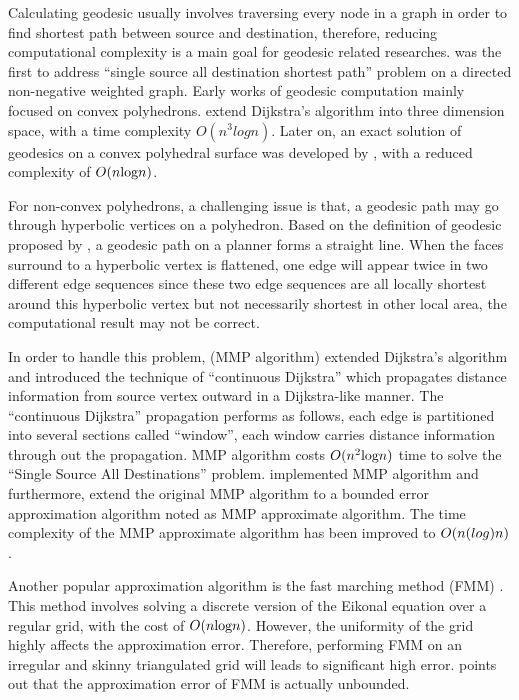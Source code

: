 Calculating geodesic usually involves traversing every node in a graph in order to find shortest path between source and destination, therefore, reducing computational complexity is a main goal for geodesic related researches.  was the first to address ``single source all destination shortest path'' problem on a directed non-negative weighted graph. Early works of geodesic computation mainly focused on convex polyhedrons.  extend Dijkstra's algorithm into three dimension space, with a time complexity $O (n^3 log n)$. Later on, an exact solution of geodesics on a convex polyhedral surface was developed by , with a reduced complexity of $O(n\textup{log}n)$.

For non-convex polyhedrons, a challenging issue is that, a geodesic path may go through hyperbolic vertices on a polyhedron. Based on the definition of geodesic proposed by , a geodesic path on a planner forms a straight line. When the faces surround to a hyperbolic vertex is flattened, one edge will appear twice in two different edge sequences since these two edge sequences are all locally shortest around this hyperbolic vertex but not necessarily shortest in other local area, the computational result may not be correct. 

In order to handle this problem,  (MMP algorithm) extended Dijkstra’s algorithm  and introduced the technique of ``continuous Dijkstra'' which propagates distance information from source vertex outward in a Dijkstra-like manner. The ``continuous Dijkstra'' propagation performs as follows,  each edge is partitioned into several sections called ``window'', each window carries distance information through out the propagation. MMP algorithm costs $O(n^{2}\textup{log}n)$ time to solve the ``Single Source All Destinations'' problem.   implemented MMP algorithm and furthermore, extend the original MMP algorithm  to a bounded error approximation algorithm noted as MMP approximate algorithm. The time complexity of the MMP approximate algorithm has been improved to $O(n\textup(log)n)$ . 

Another popular approximation algorithm is the fast marching method (FMM) . This method involves solving a discrete version of the Eikonal equation over a regular grid, with the cost of $O(n\textup{log}n)$. However, the uniformity of the grid highly affects the approximation error. Therefore, performing FMM on an irregular and skinny triangulated grid will leads to significant high error. \cite{Bose:2011} points out that the approximation error of FMM is actually unbounded. 

